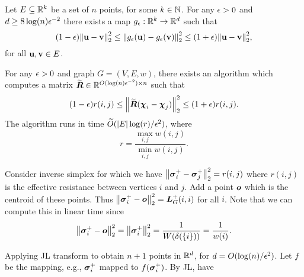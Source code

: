 \begin{theorem}
Let $E\subseteq \mathbb{R}^k$ be a set of $n$ points, for some $k\in\mathbb{N}$. For any $\epsilon>0$ and $d\geq 8\log(n)\epsilon^{-2}$ there exists a map $g_\epsilon:\mathbb{R}^k\to\mathbb{R}^d$ such that 
\begin{equation*}
    (1-\epsilon)\norm{\vb{u}-\vb{v}}_2^2 \leq \norm{g_\epsilon(\vb{u}) - g_\epsilon(\vb{v})}_2^2 \leq (1+\epsilon)\norm{\vb{u}-\vb{v}}_2^2,
\end{equation*}
for all $\vb{u},\vb{v}\in E$. 
\end{theorem}

\begin{theorem}
For any $\epsilon>0$ and graph $G=(V,E,w)$, there exists an algorithm which computes a matrix $\widetilde{\vb*{R}}\in\mathbb{R}^{O(\log(n)\epsilon^{-2})\times n}$ such that 
\begin{equation*}
    (1-\epsilon)r(i,j) \leq \norm{\widetilde{\vb*{R}}(\boldsymbol{\chi}_i-\boldsymbol{\chi}_j)}_2^2 \leq (1+\epsilon) r(i,j).
\end{equation*}
The algorithm runs in time $\widetilde{O}( |E|\log (r)/\epsilon^2)$, where 
\[r=\frac{\max_{i,j}w(i,j)}{\min_{i,j}w(i,j)}.\]
\end{theorem}

Consider inverse simplex for which we have $\norm{\vb*{\sigma}_i^+-\vb*{\sigma}_j^+}_2^2=r(i,j)$ where $r(i,j)$ is the effective resistance between vertices $i$ and $j$. Add a point $\vb*{o}$ which is the centroid of these points. Thus $\norm{\vb*{\sigma}_i^+-\vb*{o}}_2^2 = \vb*{L}_G^+(i,i)$ for all $i$. Note that we can compute this in linear time since 
\[\norm{\vb*{\sigma}_i^+-\vb*{o}}_2^2 = \norm{\vb*{\sigma}_i^+}_2^2 = \frac{1}{W(\delta(\{i\}))}=\frac{1}{w(i)}.\]

Applying JL transform to obtain $n+1$ points in $\mathbb{R}^d$, for $d=O(\log(n)/\epsilon^2)$. Let $f$ be the mapping, e.g., $\vb*{\sigma}_i^+$ mapped to $f(\vb*{\sigma}_i^+)$. By JL, have 

